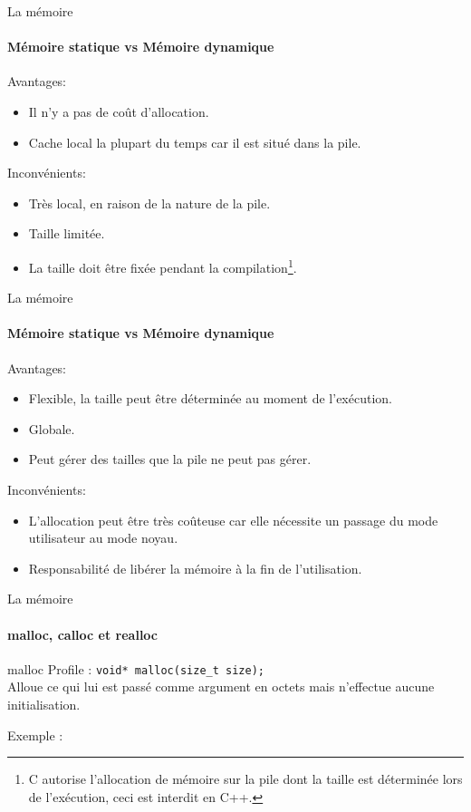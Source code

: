 \documentclass{beamer}
\begin{document}
\begin{darkframes}
  	\begin{frame}{La mémoire}
  		\framesubtitle{Mémoire statique vs Mémoire dynamique}
  		Avantages:
		\begin{itemize}
			\item Il n'y a pas de coût d'allocation.
			\item Cache local la plupart du temps car il est situé dans la pile.
		\end{itemize}
		Inconvénients:
		\begin{itemize}
			\item Très local, en raison de la nature de la pile.
			\item Taille limitée.
			\item La taille doit être fixée pendant la compilation\footnote[frame]{C autorise l'allocation de mémoire sur la pile dont la taille est déterminée lors de l'exécution, ceci est interdit en C++.}.
		\end{itemize}
  	\end{frame}
  
  	\begin{frame}{La mémoire}
  		\framesubtitle{Mémoire statique vs Mémoire dynamique}
  		Avantages:
  		\begin{itemize}
  			\item Flexible, la taille peut être déterminée au moment de l'exécution.
  			\item Globale.
  			\item Peut gérer des tailles que la pile ne peut pas gérer.
  		\end{itemize}
  		Inconvénients:
	  	\begin{itemize}
  			\item L'allocation peut être très coûteuse car elle nécessite un passage du mode utilisateur au mode noyau.
			\item Responsabilité de libérer la mémoire à la fin de l'utilisation.
	  	\end{itemize}
  	\end{frame}


  	\begin{frame}{La mémoire}
  		\framesubtitle{malloc, calloc et realloc}
  		\begin{block}{malloc}
  			\alert{Profile} : \texttt{void* malloc(size\_t size);} \\
  			Alloue ce qui lui est passé comme argument en octets mais \alert{n'effectue aucune initialisation}.
  		\end{block}
  		\begin{exampleblock}{Exemple :}
  			\mallocExample
  		\end{exampleblock}
    \end{frame}


\end{darkframes}
\end{document}
